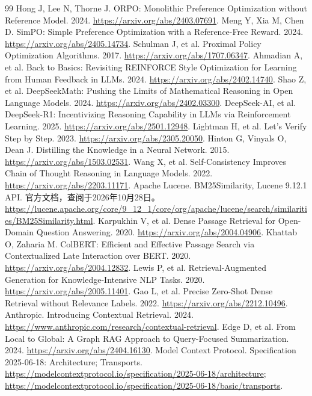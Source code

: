 \documentclass[UTF8,12pt,a4paper,fontset=fandol]{ctexbook}
\begin{document}
\begin{thebibliography}{99}
 Hong J, Lee N, Thorne J. ORPO: Monolithic Preference Optimization without Reference Model. 2024. \url{https://arxiv.org/abs/2403.07691}.
 Meng Y, Xia M, Chen D. SimPO: Simple Preference Optimization with a Reference-Free Reward. 2024. \url{https://arxiv.org/abs/2405.14734}.
 Schulman J, et al. Proximal Policy Optimization Algorithms. 2017. \url{https://arxiv.org/abs/1707.06347}.
 Ahmadian A, et al. Back to Basics: Revisiting REINFORCE Style Optimization for Learning from Human Feedback in LLMs. 2024. \url{https://arxiv.org/abs/2402.14740}.
 Shao Z, et al. DeepSeekMath: Pushing the Limits of Mathematical Reasoning in Open Language Models. 2024. \url{https://arxiv.org/abs/2402.03300}.
 DeepSeek-AI, et al. DeepSeek-R1: Incentivizing Reasoning Capability in LLMs via Reinforcement Learning. 2025. \url{https://arxiv.org/abs/2501.12948}.
 Lightman H, et al. Let's Verify Step by Step. 2023. \url{https://arxiv.org/abs/2305.20050}.
 Hinton G, Vinyals O, Dean J. Distilling the Knowledge in a Neural Network. 2015. \url{https://arxiv.org/abs/1503.02531}.
 Wang X, et al. Self-Consistency Improves Chain of Thought Reasoning in Language Models. 2022. \url{https://arxiv.org/abs/2203.11171}.
 Apache Lucene. BM25Similarity, Lucene 9.12.1 API. 官方文档，查阅于2026年10月28日。\url{https://lucene.apache.org/core/9_12_1/core/org/apache/lucene/search/similarities/BM25Similarity.html}.
 Karpukhin V, et al. Dense Passage Retrieval for Open-Domain Question Answering. 2020. \url{https://arxiv.org/abs/2004.04906}.
 Khattab O, Zaharia M. ColBERT: Efficient and Effective Passage Search via Contextualized Late Interaction over BERT. 2020. \url{https://arxiv.org/abs/2004.12832}.
 Lewis P, et al. Retrieval-Augmented Generation for Knowledge-Intensive NLP Tasks. 2020. \url{https://arxiv.org/abs/2005.11401}.
 Gao L, et al. Precise Zero-Shot Dense Retrieval without Relevance Labels. 2022. \url{https://arxiv.org/abs/2212.10496}.
 Anthropic. Introducing Contextual Retrieval. 2024. \url{https://www.anthropic.com/research/contextual-retrieval}.
 Edge D, et al. From Local to Global: A Graph RAG Approach to Query-Focused Summarization. 2024. \url{https://arxiv.org/abs/2404.16130}.
 Model Context Protocol. Specification 2025-06-18: Architecture; Transports. \url{https://modelcontextprotocol.io/specification/2025-06-18/architecture}; \url{https://modelcontextprotocol.io/specification/2025-06-18/basic/transports}.

\end{thebibliography}
\end{document}
